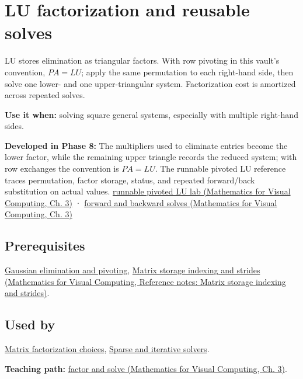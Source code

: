 \hypertarget{appendix-55e4b5b0a1e6}{}\label{referencestart:appendix-55e4b5b0a1e6}
\section{LU factorization and reusable solves}\label{appendix-55e4b5b0a1e6-lu-factorization-and-reusable-solves}

\hypertarget{appendix-55e4b5b0a1e6-lu-factorization-and-reusable-solves}{}

LU stores elimination as triangular factors. With row pivoting in this vault's convention, \(PA=LU\); apply the same permutation to each right-hand side, then solve one lower- and one upper-triangular system. Factorization cost is amortized across repeated solves.

\textbf{Use it when:} solving square general systems, especially with multiple right-hand sides.

\textbf{Developed in Phase 8:} The multipliers used to eliminate entries become the lower factor, while the remaining upper triangle records the reduced system; with row exchanges the convention is \(PA=LU\). The runnable pivoted LU reference traces permutation, factor storage, status, and repeated forward/back substitution on actual values. \href{../02-Mathematics-for-Visual-Computing/main.pdf\#nameddest=01-foundations-i-ch019-a-runnable-pivoted-lu-reference-preserves-the-elimination-history}{runnable pivoted LU lab (Mathematics for Visual Computing, Ch. 3)} · \href{../02-Mathematics-for-Visual-Computing/main.pdf\#nameddest=01-foundations-i-ch019-triangular-solves-perform-the-cheap-second-half}{forward and backward solves (Mathematics for Visual Computing, Ch. 3)}

\subsection{Prerequisites}\label{appendix-55e4b5b0a1e6-prerequisites}

\hypertarget{appendix-55e4b5b0a1e6-prerequisites}{}

\hyperref[appendix-f6e77f4a200f]{Gaussian elimination and pivoting}, \href{../02-Mathematics-for-Visual-Computing/main.pdf\#nameddest=appendix-ffdc1d4e5350}{Matrix storage indexing and strides (Mathematics for Visual Computing, Reference notes: Matrix storage indexing and strides)}.

\subsection{Used by}\label{appendix-55e4b5b0a1e6-used-by}

\hypertarget{appendix-55e4b5b0a1e6-used-by}{}

\hyperref[appendix-221a483bec2d]{Matrix factorization choices}, \hyperref[appendix-67c87a3d9e94]{Sparse and iterative solvers}.

\textbf{Teaching path:} \href{../02-Mathematics-for-Visual-Computing/main.pdf\#nameddest=01-foundations-i-ch019-elimination-turns-the-geometry-into-an-auditable-calculation}{factor and solve (Mathematics for Visual Computing, Ch. 3)}.
